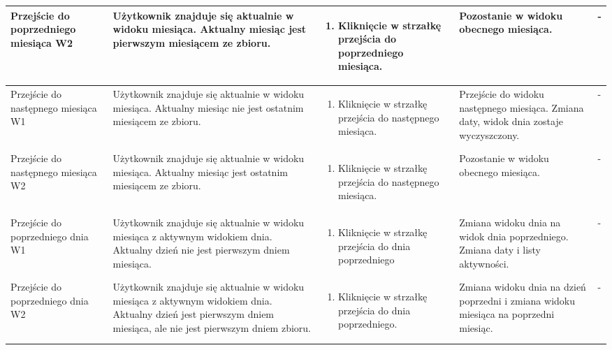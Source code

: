 \documentclass{article}
\begin{document}
\begin{flushleft}
\begin{longtable}[H]{| m{3.5cm} | m{3.5cm} | m{3.5cm} | m{3.5cm} | m{3.5cm} |}
	Przejście do poprzedniego miesiąca W2 & Użytkownik znajduje się aktualnie w widoku miesiąca. Aktualny miesiąc jest pierwszym miesiącem ze zbioru. & \begin{enumerate}[leftmargin =*, 
	topsep=0pt] \item Kliknięcie w strzałkę przejścia do poprzedniego miesiąca. \end{enumerate} & Pozostanie w widoku obecnego miesiąca. & - \\ \hline

	Przejście do następnego miesiąca W1 & Użytkownik znajduje się aktualnie w widoku miesiąca. Aktualny miesiąc nie jest ostatnim miesiącem ze zbioru. & \begin{enumerate}[leftmargin =*, 
	topsep=0pt] \item Kliknięcie w strzałkę przejścia do następnego miesiąca. \end{enumerate} & Przejście do widoku następnego miesiąca. Zmiana daty, widok dnia zostaje wyczyszczony. & 
	- \\ \hline

	Przejście do następnego miesiąca W2 & Użytkownik znajduje się aktualnie w widoku miesiąca. Aktualny miesiąc jest ostatnim miesiącem ze zbioru. & \begin{enumerate}[leftmargin =*, topsep=0pt] 
	\item Kliknięcie w strzałkę przejścia do następnego miesiąca. \end{enumerate} & Pozostanie w widoku obecnego miesiąca. & - \\ \hline
	
	Przejście do poprzedniego dnia W1 & Użytkownik znajduje się aktualnie w widoku miesiąca z aktywnym widokiem dnia. Aktualny dzień nie jest pierwszym dniem miesiąca. & \begin{enumerate}
	[leftmargin =*, topsep=0pt] \item Kliknięcie w strzałkę przejścia do dnia poprzedniego \end{enumerate} & Zmiana widoku dnia na widok dnia poprzedniego. Zmiana daty i listy aktywności. & 
	- \\ \hline

	Przejście do poprzedniego dnia W2 & Użytkownik znajduje się aktualnie w widoku miesiąca z aktywnym widokiem dnia. Aktualny dzień jest pierwszym dniem miesiąca, ale nie jest pierwszym dniem 
	zbioru. & \begin{enumerate}[leftmargin =*, topsep=0pt] \item Kliknięcie w strzałkę przejścia do dnia poprzedniego. \end{enumerate} & Zmiana widoku dnia na dzień poprzedni i zmiana widoku 
	miesiąca na poprzedni miesiąc. & - \\ \hline


\end{longtable}
\end{flushleft}
\end{document}
